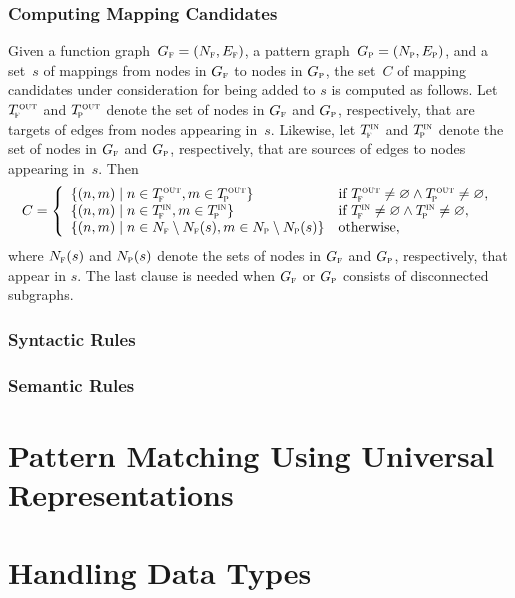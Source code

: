 \subsubsection{Computing Mapping Candidates}

Given a \gls{function graph}~\mbox{$\fG = \mPair{\fN}{\fE}$}, a \gls{pattern
  graph}~\mbox{$\pG = \mPair{\pN}{\pE}$}, and a set~$s$ of mappings from
\glspl{node} in $G_{\textrm{\textsc{f}}}$ to \glspl{node} in $G_{\textrm{\textsc{p}}}$, the set~$C$ of mapping
candidates under consideration for being added to $s$ is computed as follows.
%
Let $T_{\!\textrm{\textsc{f}}}^{\hspace{.5pt}\textrm{\textsc{out}}}$ and $T_{\!\textrm{\textsc{p}}}^{\hspace{.5pt}\textrm{\textsc{out}}}$ denote the set of \glspl{node} in $G_{\textrm{\textsc{f}}}$ and $G_{\textrm{\textsc{p}}}$,
respectively, that are targets of \glspl{edge} from \glspl{node} appearing
in~$s$.
%
Likewise, let $T_{\!\textrm{\textsc{f}}}^{\textrm{\textsc{in}}}$ and $T_{\!\textrm{\textsc{p}}}^{\textrm{\textsc{in}}}$ denote the set of \glspl{node} in $G_{\textrm{\textsc{f}}}$ and
$G_{\textrm{\textsc{p}}}$, respectively, that are sources of \glspl{edge} to \glspl{node} appearing
in~$s$.
%
Then
%
\begin{equation}
  C = \left\{
  \begin{array}{ll}
      \mSetBuilder{\mPair{n}{m}}{n \in \fTout, m \in \pTout}
    & \text{if} \ \fTout \neq \emptyset \mAnd \pTout \neq \emptyset, \\
      \mSetBuilder{\mPair{n}{m}}{n \in \fTin, m \in \pTin}
    & \text{if} \ \fTin \neq \emptyset \mAnd \pTin \neq \emptyset, \\
      \mSetBuilder{\mPair{n}{m}}{
                                  n \in \fN \setminus \fN(s),
                                  m \in \pN \setminus \pN(s)
                                }
    & \text{otherwise},
  \end{array}
 \right.
\end{equation}
%
where $N_{\textrm{\textsc{f}}}(s)$ and $N_{\textrm{\textsc{p}}}(s)$ denote the sets of \glspl{node} in $G_{\textrm{\textsc{f}}}$ and $G_{\textrm{\textsc{p}}}$,
respectively, that appear in $s$.
%
The last clause is needed when $G_{\textrm{\textsc{f}}}$ or $G_{\textrm{\textsc{p}}}$ consists of disconnected
\glspl{subgraph}.



\subsubsection{Syntactic Rules}




\subsubsection{Semantic Rules}




\section{Pattern Matching Using Universal Representations}





\section{Handling Data Types}

